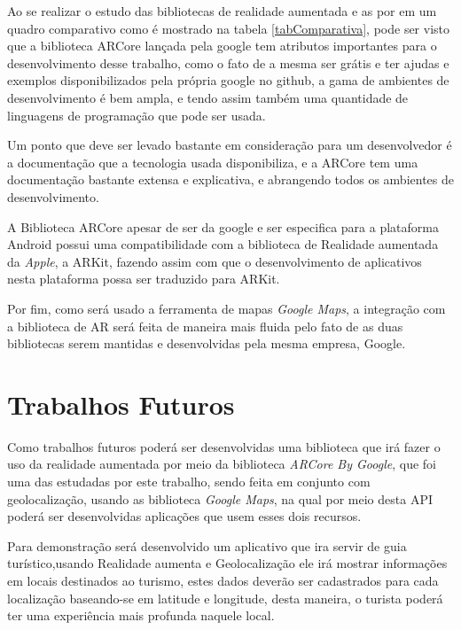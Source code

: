 Ao se realizar o estudo das bibliotecas de realidade aumentada e as por em um quadro comparativo como é mostrado na tabela \ref{tabComparativa}, pode ser visto que a biblioteca ARCore lançada pela google tem atributos importantes para o desenvolvimento desse trabalho, como o fato de a mesma ser grátis e ter ajudas e exemplos disponibilizados pela própria google no github, a gama de ambientes de desenvolvimento é bem ampla, e tendo assim também uma quantidade de linguagens de programação que pode ser usada.

Um ponto que deve ser levado bastante em consideração para um desenvolvedor é a documentação que a tecnologia usada disponibiliza, e a ARCore tem uma documentação bastante extensa e explicativa, e abrangendo todos os ambientes de desenvolvimento.

A Biblioteca ARCore apesar de ser da google e ser especifica para a plataforma Android possui uma compatibilidade com a biblioteca de Realidade aumentada da \textit{Apple}, a ARKit, fazendo assim com que o desenvolvimento de aplicativos nesta plataforma possa ser traduzido para ARKit.

Por fim, como será usado a ferramenta de mapas \textit{Google Maps}, a integração com a biblioteca de AR será feita de maneira mais fluida pelo fato de as duas bibliotecas serem mantidas e desenvolvidas pela mesma empresa, Google.

\section{Trabalhos Futuros}
Como trabalhos futuros poderá ser desenvolvidas uma biblioteca que irá fazer o uso da realidade aumentada por meio da biblioteca \textit{ARCore By Google}, que foi uma das estudadas por este trabalho, sendo feita em conjunto com geolocalização, usando as biblioteca \textit{Google Maps}, na qual por meio desta API poderá ser desenvolvidas aplicações que usem esses dois recursos.
 
Para demonstração será desenvolvido um aplicativo que ira servir de guia turístico,usando Realidade aumenta e Geolocalização ele irá mostrar informações em locais destinados ao turismo, estes dados deverão ser cadastrados para cada localização baseando-se em latitude e longitude, desta maneira, o turista poderá ter uma experiência mais profunda naquele local.

